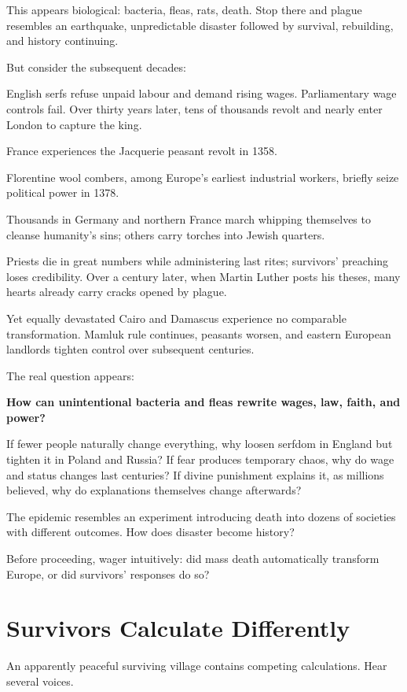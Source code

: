 This appears biological: bacteria, fleas, rats, death. Stop there and plague resembles an earthquake, unpredictable disaster followed by survival, rebuilding, and history continuing.

But consider the subsequent decades:

English serfs refuse unpaid labour and demand rising wages. Parliamentary wage controls fail. Over thirty years later, tens of thousands revolt and nearly enter London to capture the king.

France experiences the Jacquerie peasant revolt in 1358.

Florentine wool combers, among Europe's earliest industrial workers, briefly seize political power in 1378.

Thousands in Germany and northern France march whipping themselves to cleanse humanity's sins; others carry torches into Jewish quarters.

Priests die in great numbers while administering last rites; survivors' preaching loses credibility. Over a century later, when Martin Luther posts his theses, many hearts already carry cracks opened by plague.

Yet equally devastated Cairo and Damascus experience no comparable transformation. Mamluk rule continues, peasants worsen, and eastern European landlords tighten control over subsequent centuries.

The real question appears:

\textbf{How can unintentional bacteria and fleas rewrite wages, law, faith, and power?}

If fewer people naturally change everything, why loosen serfdom in England but tighten it in Poland and Russia? If fear produces temporary chaos, why do wage and status changes last centuries? If divine punishment explains it, as millions believed, why do explanations themselves change afterwards?

The epidemic resembles an experiment introducing death into dozens of societies with different outcomes. How does disaster become history?

Before proceeding, wager intuitively: did mass death automatically transform Europe, or did survivors' responses do so?

\section{Survivors Calculate Differently}
An apparently peaceful surviving village contains competing calculations. Hear several voices.

